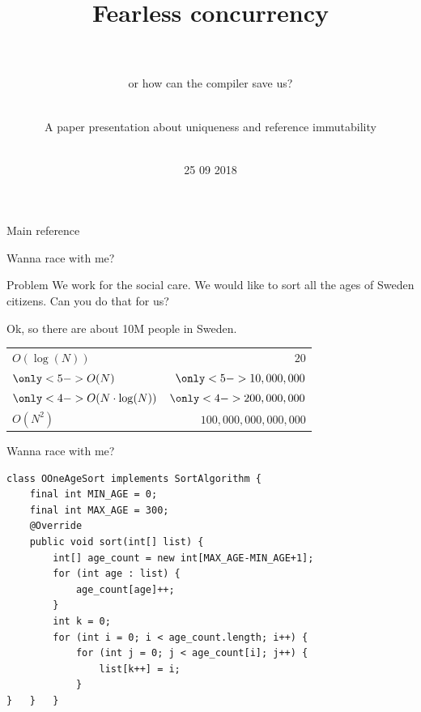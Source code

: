 \documentclass{beamer}
\title{\centering Fearless concurrency \\ ~}
\subtitle{ or how can the compiler save us?}
\author{\centering ~ \\ A paper presentation about uniqueness and reference immutability \\ ~}
\institute{Thomas Lacroix \\ KTH -- Pardis 18}
\date{25 09 2018}
\begin{document}

\begin{frame}
    \maketitle
\end{frame}


\begin{frame}{Main reference}
    \nocite{*}
    
    
\end{frame}


\begin{frame}{Wanna race with me?}
	\begin{block}{Problem}
	We work for the social care. We would like to sort all the ages of Sweden
	citizens. Can you do that for us?
	\end{block}
	\vfill\pause
	Ok, so there are about 10M people in Sweden.
	\vfill\pause
	\centering
	\newcommand{\blue}{\only<4->{\color{blue}}}
	\newcommand{\green}{\only<5->{\color{dkgreen}}}
	\begin{tabular}{|l|r|}
		\hline
		$ O(\log(N))               $ & $                  20 $ \\
		$ \green O(N)              $ & $ \green   10,000,000 $ \\
		$ \blue O(N \cdot \log(N)) $ & $ \blue   200,000,000 $ \\
		$ O(N^2)                   $ & $ 100,000,000,000,000 $ \\
		\hline
	\end{tabular}
\end{frame}


\begin{frame}[fragile]{Wanna race with me?}
	\begin{lstlisting}
class OOneAgeSort implements SortAlgorithm {
    final int MIN_AGE = 0;
    final int MAX_AGE = 300;
    @Override
    public void sort(int[] list) {
        int[] age_count = new int[MAX_AGE-MIN_AGE+1];
        for (int age : list) {
            age_count[age]++;
        }
        int k = 0;
        for (int i = 0; i < age_count.length; i++) {
            for (int j = 0; j < age_count[i]; j++) {
                list[k++] = i;
            }
}   }   }
	\end{lstlisting}
\end{frame}
\end{document}
